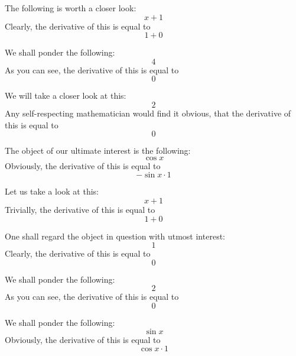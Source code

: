 \documentclass{article}
\begin{document}
The following is worth a closer look:
\begin{equation}
x + 1 
\end{equation}
Clearly, the derivative of this is equal to
\begin{equation}
1 + 0 
\end{equation}

We shall ponder the following:
\begin{equation}
4 
\end{equation}
As you can see, the derivative of this is equal to
\begin{equation}
0 
\end{equation}

We will take a closer look at this:
\begin{equation}
2 
\end{equation}
Any self-respecting mathematician would find it obvious, that the derivative of this is equal to
\begin{equation}
0 
\end{equation}

The object of our ultimate interest is the following:
\begin{equation}
\cos x 
\end{equation}
Obviously, the derivative of this is equal to
\begin{equation}
-\sin x \cdot 1 
\end{equation}

Let us take a look at this:
\begin{equation}
x + 1 
\end{equation}
Trivially, the derivative of this is equal to
\begin{equation}
1 + 0 
\end{equation}

One shall regard the object in question with utmost interest:
\begin{equation}
1 
\end{equation}
Clearly, the derivative of this is equal to
\begin{equation}
0 
\end{equation}

We shall ponder the following:
\begin{equation}
2 
\end{equation}
As you can see, the derivative of this is equal to
\begin{equation}
0 
\end{equation}

We shall ponder the following:
\begin{equation}
\sin x 
\end{equation}
Obviously, the derivative of this is equal to
\begin{equation}
\cos x \cdot 1 
\end{equation}
\end{document}
